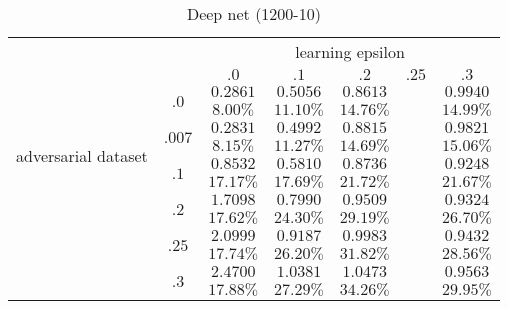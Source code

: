		\begin{table}[h]
		\centering
		        \begin{tabular}{cc||ccccc}

		        	& &  \multicolumn{5}{c}{learning epsilon} \\
		        	& &  $.0$ & $.1$ & $.2$ & $.25$ & $.3$ \\
		            \hline \hline
		            \multirow{8}{*}{adversarial dataset} 
		            	& \multirow{2}{*}{$.0$}  &$0.2861 	$&$0.5056 	$&$0.8613 	$& &$0.9940 	$ \\ 
		            	&                        &$8.00\%	$&$11.10\%	$&$14.76\%	$& &$14.99\%	$ \\ \cline{2-7} 
		            	& \multirow{2}{*}{$.007$}&$0.2831 	$&$0.4992 	$&$0.8815 	$& &$0.9821 	$ \\ 
		            	&                        &$8.15\%	$&$11.27\%	$&$14.69\%	$& &$15.06\%	$ \\ \cline{2-7} 
		            	& \multirow{2}{*}{$.1$}  &$0.8532 	$&$0.5810 	$&$0.8736 	$& &$0.9248 	$ \\
		            	&                        &$17.17\%	$&$17.69\%	$&$21.72\%	$& &$21.67\%	$ \\ \cline{2-7}
		                & \multirow{2}{*}{$.2$}  &$1.7098 	$&$0.7990 	$&$0.9509 	$& &$0.9324 	$ \\
		                &                        &$17.62\%	$&$24.30\%	$&$29.19\%	$& &$26.70\%	$ \\ \cline{2-7}
		                & \multirow{2}{*}{$.25$} &$2.0999 	$&$0.9187 	$&$0.9983 	$& &$0.9432 	$ \\
		                &                        &$17.74\%	$&$26.20\%	$&$31.82\%	$& &$28.56\%	$ \\ \cline{2-7}
		                & \multirow{2}{*}{$.3$}  &$2.4700 	$&$1.0381 	$&$1.0473 	$& &$0.9563 	$ \\
		                &                        &$17.88\%	$&$27.29\%	$&$34.26\%	$& &$29.95\%	$ \\
		        \end{tabular}
		    \caption{Deep net (1200-10)}
		    \label{tab:xxx}
		\end{table}